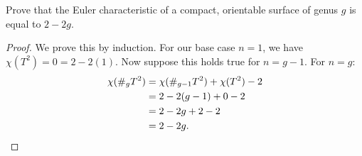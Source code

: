 \documentclass[10pt,oneside,openany]{memoir}
\begin{document}
\begin{exercise}[manual-num={1}]
	Prove that the Euler characteristic of a compact, orientable surface of genus $g$ is equal to $2 - 2g$.
\end{exercise}

	\begin{proof}
		We prove this by induction. For our base case $n=1$, we have $\chi(T^2) = 0 = 2 - 2(1)$. Now suppose this holds true for $n = g-1$. For $n = g$:
		\begin{align*}
			\chi( \#_{g}T^2)
			&=\chi(\#_{g-1}T^2) + \chi(T^2) - 2 \\
			&=2 - 2(g-1) + 0 - 2 \\
			&= 2 - 2g + 2 - 2 \\
			&= 2-2g. \qedhere
		\end{align*}
	\end{proof}
\end{document}
